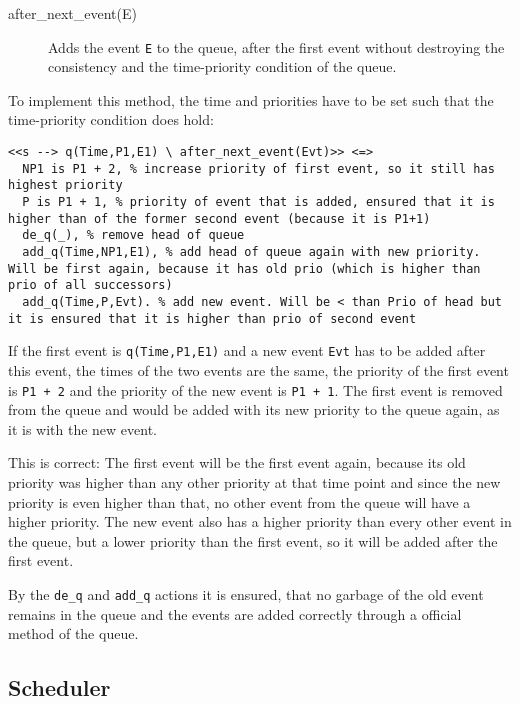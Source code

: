 \begin{description}
 \item[after\_next\_event(E)] Adds the event \verb|E| to the queue, after the first event without destroying the consistency and the time-priority condition of the queue.
\end{description}

To implement this method, the time and priorities have to be set such that the time-priority condition does hold:

\begin{lstlisting}
<<s --> q(Time,P1,E1) \ after_next_event(Evt)>> <=> 
  NP1 is P1 + 2, % increase priority of first event, so it still has highest priority
  P is P1 + 1, % priority of event that is added, ensured that it is higher than of the former second event (because it is P1+1)
  de_q(_), % remove head of queue
  add_q(Time,NP1,E1), % add head of queue again with new priority. Will be first again, because it has old prio (which is higher than prio of all successors)
  add_q(Time,P,Evt). % add new event. Will be < than Prio of head but it is ensured that it is higher than prio of second event
\end{lstlisting}

If the first event is \verb|q(Time,P1,E1)| and a new event \verb|Evt| has to be added after this event, the times of the two events are the same, the priority of the first event is \verb|P1 + 2| and the priority of the new event is \verb|P1 + 1|. The first event is removed from the queue and would be added with its new priority to the queue again, as it is with the new event. 

This is correct: The first event will be the first event again, because its old priority was higher than any other priority at that time point and since the new priority is even higher than that, no other event from the queue will have a higher priority. The new event also has a higher priority than every other event in the queue, but a lower priority than the first event, so it will be added after the first event.

By the \verb|de_q| and \verb|add_q| actions it is ensured, that no garbage of the old event remains in the queue and the events are added correctly through a official method of the queue.

\subsection{Scheduler}


